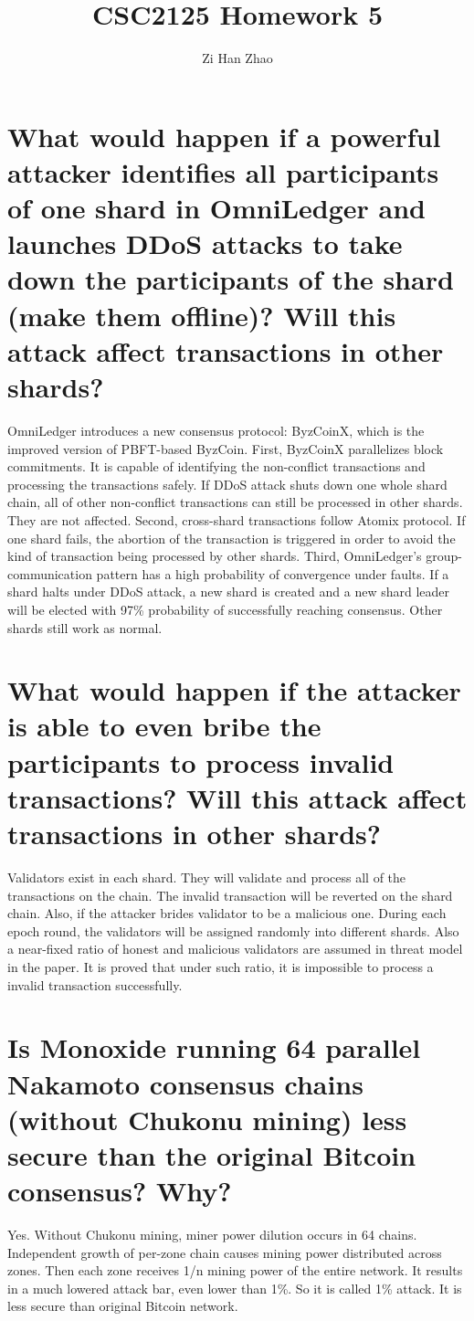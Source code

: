\documentclass{article}
\author{Zi Han Zhao}
\affil{1001103708}
\date{}
\title{CSC2125 Homework 5}
\begin{document}
\maketitle
\renewcommand{\thesubsection}{(\alph{subsection})}
\section{What would happen if a powerful attacker identifies all participants of one shard
in OmniLedger and launches DDoS attacks to take down the participants of the
shard (make them offline)? Will this attack affect transactions in other shards?}
OmniLedger introduces a new consensus protocol: ByzCoinX, which is the improved version
of PBFT-based ByzCoin.
First, ByzCoinX parallelizes block commitments. 
It is capable of identifying the non-conflict transactions and processing the transactions safely.
If DDoS attack shuts down one whole shard chain, 
all of other non-conflict transactions can still be processed in other shards. They are not affected.
Second, cross-shard transactions follow Atomix protocol. 
If one shard fails, the abortion of the transaction is triggered
in order to avoid the kind of transaction being processed by other shards.
Third, OmniLedger’s group-communication
pattern has a high probability of convergence under faults.
If a shard halts under DDoS attack, 
a new shard is created and a new shard leader will be elected with 97\% probability of successfully reaching consensus.
Other shards still work as normal.
\section{What would happen if the attacker is able to even bribe the participants to
process invalid transactions? Will this attack affect transactions in other shards?}
Validators exist in each shard. They will validate and process all of the transactions
on the chain. The invalid transaction will be reverted on the shard chain.
Also, if the attacker brides validator to be a malicious one. 
During each epoch round, the validators will be assigned randomly into different shards.
Also a near-fixed ratio of honest and malicious validators are assumed in threat model in the paper.
It is proved that under such ratio, it is impossible to process a invalid transaction successfully.
\section{Is Monoxide running 64 parallel Nakamoto consensus chains (without Chukonu
mining) less secure than the original Bitcoin consensus? Why?}
Yes. Without Chukonu mining, miner power dilution occurs in 64 chains.
Independent growth of per-zone chain causes mining power
distributed across zones.
Then each zone receives 1/n mining power of the entire network.
It results in a much lowered attack bar, even lower than 1\%.
So it is called 1\% attack. It is less secure than original Bitcoin network.
\end{document}
